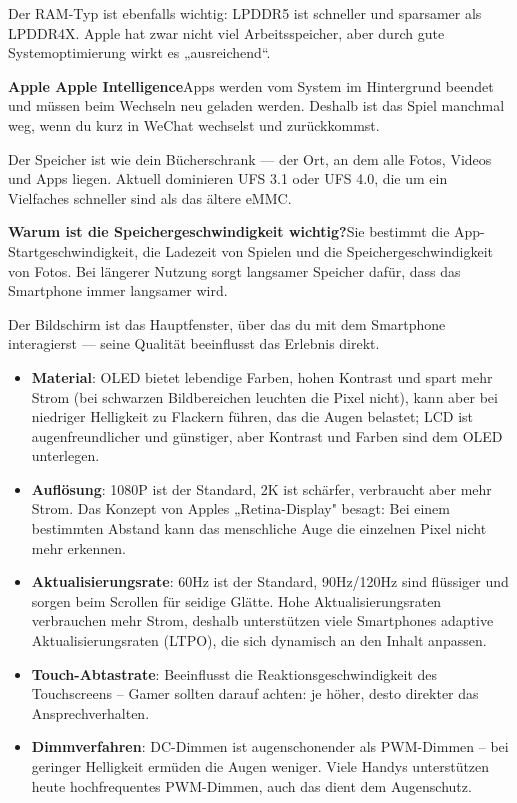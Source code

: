 Der RAM-Typ ist ebenfalls wichtig: LPDDR5 ist schneller und sparsamer als LPDDR4X. Apple hat zwar nicht viel Arbeitsspeicher, aber durch gute Systemoptimierung wirkt es „ausreichend“.

\textbf{Apple Apple Intelligence}Apps werden vom System im Hintergrund beendet und müssen beim Wechseln neu geladen werden. Deshalb ist das Spiel manchmal weg, wenn du kurz in WeChat wechselst und zurückkommst.


Der Speicher ist wie dein Bücherschrank — der Ort, an dem alle Fotos, Videos und Apps liegen. Aktuell dominieren UFS 3.1 oder UFS 4.0, die um ein Vielfaches schneller sind als das ältere eMMC.

\textbf{Warum ist die Speichergeschwindigkeit wichtig?}Sie bestimmt die App-Startgeschwindigkeit, die Ladezeit von Spielen und die Speichergeschwindigkeit von Fotos. Bei längerer Nutzung sorgt langsamer Speicher dafür, dass das Smartphone immer langsamer wird.


Der Bildschirm ist das Hauptfenster, über das du mit dem Smartphone interagierst — seine Qualität beeinflusst das Erlebnis direkt.

\begin{itemize}
  \item \textbf{Material}: OLED bietet lebendige Farben, hohen Kontrast und spart mehr Strom (bei schwarzen Bildbereichen leuchten die Pixel nicht), kann aber bei niedriger Helligkeit zu Flackern führen, das die Augen belastet; LCD ist augenfreundlicher und günstiger, aber Kontrast und Farben sind dem OLED unterlegen.
  \item \textbf{Auflösung}: 1080P ist der Standard, 2K ist schärfer, verbraucht aber mehr Strom. Das Konzept von Apples „Retina-Display" besagt: Bei einem bestimmten Abstand kann das menschliche Auge die einzelnen Pixel nicht mehr erkennen.
  \item \textbf{Aktualisierungsrate}: 60Hz ist der Standard, 90Hz/120Hz sind flüssiger und sorgen beim Scrollen für seidige Glätte. Hohe Aktualisierungsraten verbrauchen mehr Strom, deshalb unterstützen viele Smartphones adaptive Aktualisierungsraten (LTPO), die sich dynamisch an den Inhalt anpassen.
  \item \textbf{Touch-Abtastrate}: Beeinflusst die Reaktionsgeschwindigkeit des Touchscreens – Gamer sollten darauf achten: je höher, desto direkter das Ansprechverhalten.
  \item \textbf{Dimmverfahren}: DC-Dimmen ist augenschonender als PWM-Dimmen – bei geringer Helligkeit ermüden die Augen weniger. Viele Handys unterstützen heute hochfrequentes PWM-Dimmen, auch das dient dem Augenschutz.
\end{itemize}

